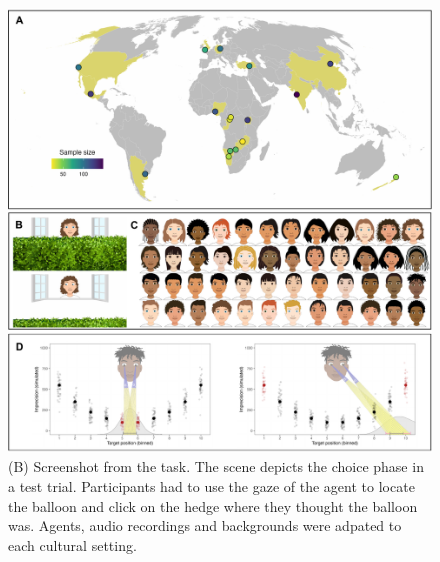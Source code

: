 \documentclass[
  man,floatsintext]{apa6}
\begin{document}
\begin{figure}

{\centering \includegraphics[width=1\linewidth]{../visuals/fig1} 

}

\caption{(B) Screenshot from the task. The scene depicts the choice phase in a test trial. Participants had to use the gaze of the agent to locate the balloon and click on the hedge where they thought the balloon was. Agents, audio recordings and backgrounds were adpated to each cultural setting.}\label{fig:fig1}
\end{figure}
\end{document}
